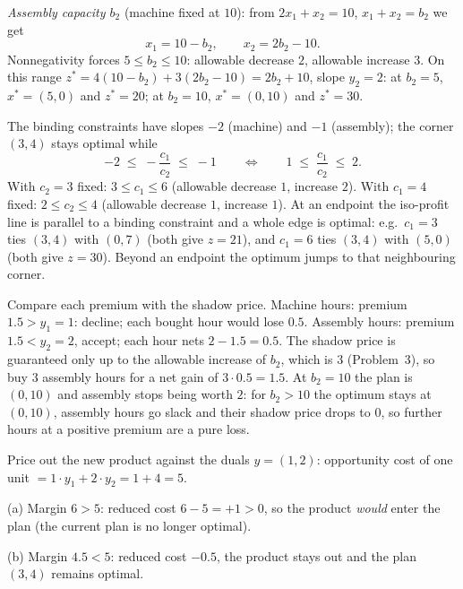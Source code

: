 \begin{solutions}
        \emph{Assembly capacity $b_{2}$} (machine fixed at $10$): from
        $2x_{1}+x_{2}=10$, $x_{1}+x_{2}=b_{2}$ we get
        \[
          x_{1}=10-b_{2},\qquad x_{2}=2b_{2}-10 .
        \]
        Nonnegativity forces $5\le b_{2}\le 10$: allowable decrease $2$,
        allowable increase $3$. On this range
        $z^{*}=4(10-b_{2})+3(2b_{2}-10)=2b_{2}+10$, slope $y_{2}=2$: at
        $b_{2}=5$, $x^{*}=(5,0)$ and $z^{*}=20$; at $b_{2}=10$,
        $x^{*}=(0,10)$ and $z^{*}=30$.

  \item The binding constraints have slopes $-2$ (machine) and $-1$
        (assembly); the corner $(3,4)$ stays optimal while
        \[
          -2\;\le\;-\frac{c_{1}}{c_{2}}\;\le\;-1
          \qquad\Longleftrightarrow\qquad
          1\;\le\;\frac{c_{1}}{c_{2}}\;\le\;2 .
        \]
        With $c_{2}=3$ fixed: $3\le c_{1}\le 6$ (allowable decrease $1$,
        increase $2$). With $c_{1}=4$ fixed: $2\le c_{2}\le 4$ (allowable
        decrease $1$, increase $1$). At an endpoint the iso-profit line is
        parallel to a binding constraint and a whole edge is optimal:
        e.g.\ $c_{1}=3$ ties $(3,4)$ with $(0,7)$ (both give $z=21$), and
        $c_{1}=6$ ties $(3,4)$ with $(5,0)$ (both give $z=30$). Beyond an
        endpoint the optimum jumps to that neighbouring corner.

  \item Compare each premium with the shadow price. Machine hours:
        premium $1.5>y_{1}=1$: decline; each bought hour would lose
        $0.5$. Assembly hours: premium $1.5<y_{2}=2$, accept; each
        hour nets $2-1.5=0.5$. The shadow price is guaranteed only up to
        the allowable increase of $b_{2}$, which is $3$ (Problem~3), so
        buy $3$ assembly hours for a net gain of $3\cdot 0.5=1.5$. At
        $b_{2}=10$ the plan is $(0,10)$ and assembly stops being worth
        $2$: for $b_{2}>10$ the optimum stays at $(0,10)$, assembly hours
        go slack and their shadow price drops to $0$, so further hours at
        a positive premium are a pure loss.

  \item Price out the new product against the duals $y=(1,2)$:
        opportunity cost of one unit $=1\cdot y_{1}+2\cdot y_{2}
        =1+4=5$.

        (a) Margin $6>5$: reduced cost $6-5=+1>0$, so the product
        \emph{would} enter the plan (the current plan is no longer
        optimal).

        (b) Margin $4.5<5$: reduced cost $-0.5$, the product stays out
        and the plan $(3,4)$ remains optimal.


\end{solutions}
